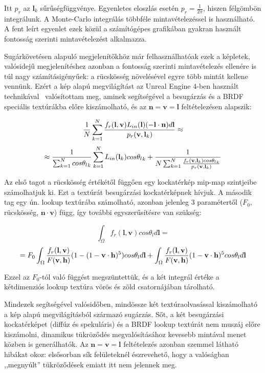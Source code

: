 Itt \(p_r\) az \(\mathbf{l}_k\) sűrűségfüggvénye. Egyenletes eloszlás esetén \(p_r = \frac{1}{2\pi}\), hiszen félgömbön integrálunk. A Monte-Carlo integrálás többféle mintavételezéssel is használható. A fent leírt egyenlet ezek közül a számítógépes grafikában gyakran használt fontosság szerinti mintavételezést alkalmazza.

Sugárkövetésen alapuló megjelenítőkhöz már felhasználhatóak ezek a képletek, valósidejű megjelenítéshez azonban a fontosság szerinti mintavételezés ellenére is túl nagy számításigényűek: a rücskösség növelésével egyre több mintát kellene vennünk. Ezért a kép alapú megvilágítást az Unreal Engine 4-ben használt technikával~\cite{karis2013real} valósítottam meg, aminek segítségével a besugárzás és a BRDF speciális textúrákba előre kiszámolható, és az \(\mathbf{n} = \mathbf{v} = \mathbf{l}\) feltételezésen alapszik:

\[
{ 1 \over N } \sum_{k=1}^{N} { { f_r(\mathbf{l}, \mathbf{v}) L_{in}(\mathbf{l})(-\mathbf{l} \cdot \mathbf{n}) d\mathbf{l} } \over { p_r(\mathbf{v}, \mathbf{l}_k) } } \approx
\]
\[
\approx { { 1 \over \sum_{k=1}^{N} cos{\theta_l}_k } \sum_{k=1}^{N} L_{in}(\mathbf{l}_k)cos{\theta_l}_k } + { 1 \over N \sum_{k=1}^{N} { { f_r(\mathbf{v}, \mathbf{l}_k) cos{\theta_l}_k} \over { p_r(\mathbf{v}, \mathbf{l}_k) } } }
\]

Az első tagot a rücskösség értékétől függően egy kockatérkép mip-map szintjeibe számolhatjuk ki. Ezt a textúrát besugárzási kockatérképnek hívjuk. A második tag egy ún. lookup textúrába számolható, azonban jelenleg 3 paramétertől (\(F_0\), rücskösség, \(\mathbf{n} \cdot \mathbf{v}\)) függ, így további egyszerűsítésre van szükség:

\[
\int_{\Omega} { f_r(\mathbf{l}, \mathbf{v}) cos\theta_l d\mathbf{l} } =
\]
\[= F_0 \int_{\Omega} { { f_r(\mathbf{l}, \mathbf{v}) \over F(\mathbf{v}, \mathbf{h}) } (1 - (1 - \mathbf{v} \cdot \mathbf{h})^5) cos\theta_l d\mathbf{l} } + \int_{\Omega} { { f_r(\mathbf{l}, \mathbf{v}) \over F(\mathbf{v}, \mathbf{h}) } (1 - \mathbf{v} \cdot \mathbf{h})^5 cos\theta_l d\mathbf{l} }
\]

Ezzel az \(F_0\)-tól való függést megszüntettük, és a két integrál értéke a kétdimenziós lookup textúra vörös és zöld csatornájában tárolható.

Mindezek segítségével valósidőben, mindössze két textúraolvasással kiszámolható a kép alapú megvilágításból származó sugárzás. Sőt, a két besugárzási kockatérképet (diffúz és spekuláris) és a BRDF lookup textúrát nem muszáj előre kiszámolni, dinamikus tükröződés megvalósításához kevesebb mintával menet közben is generálhatók. Az \(\mathbf{n} = \mathbf{v} = \mathbf{l}\) feltételezés azonban szemmel látható hibákat okoz: elsősorban sík felületeknél észrevehető, hogy a valóságban ,,megnyúlt'' tükröződések emiatt itt nem jelennek meg.

